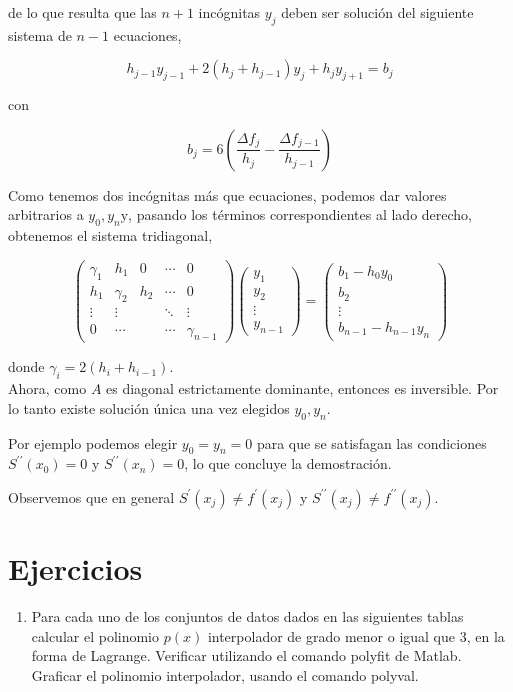 \documentclass[10pt]{book}
\begin{document}
de lo que resulta que las $n+1$ incógnitas $y_{j}$ deben ser solución del siguiente sistema de $n-1$ ecuaciones,

$$
h_{j-1} y_{j-1}+2\left(h_{j}+h_{j-1}\right) y_{j}+h_{j} y_{j+1}=b_{j}
$$

con

$$
b_{j}=6\left(\frac{\Delta f_{j}}{h_{j}}-\frac{\Delta f_{j-1}}{h_{j-1}}\right)
$$

Como tenemos dos incógnitas más que ecuaciones, podemos dar valores arbitrarios a $y_{0}, y_{n} \mathrm{y}$, pasando los términos correspondientes al lado derecho, obtenemos el sistema tridiagonal,

$$
\left(\begin{array}{ccccc}
\gamma_{1} & h_{1} & 0 & \cdots & 0 \\
h_{1} & \gamma_{2} & h_{2} & \cdots & 0 \\
\vdots & \vdots & & \ddots & \vdots \\
0 & \cdots & & \cdots & \gamma_{n-1}
\end{array}\right)\left(\begin{array}{c}
y_{1} \\
y_{2} \\
\vdots \\
y_{n-1}
\end{array}\right)=\left(\begin{array}{c}
b_{1}-h_{0} y_{0} \\
b_{2} \\
\vdots \\
b_{n-1}-h_{n-1} y_{n}
\end{array}\right)
$$

donde $\gamma_{i}=2\left(h_{i}+h_{i-1}\right)$.\\
Ahora, como $A$ es diagonal estrictamente dominante, entonces es inversible. Por lo tanto existe solución única una vez elegidos $y_{0}, y_{n}$.

Por ejemplo podemos elegir $y_{0}=y_{n}=0$ para que se satisfagan las condiciones $S^{\prime \prime}\left(x_{0}\right)=0$ y $S^{\prime \prime}\left(x_{n}\right)=0$, lo que concluye la demostración.

Observemos que en general $S^{\prime}\left(x_{j}\right) \neq f^{\prime}\left(x_{j}\right)$ y $S^{\prime \prime}\left(x_{j}\right) \neq f^{\prime \prime}\left(x_{j}\right)$.

\section{Ejercicios}
\begin{enumerate}
  \item Para cada uno de los conjuntos de datos dados en las siguientes tablas calcular el polinomio $p(x)$ interpolador de grado menor o igual que 3, en la forma de Lagrange. Verificar utilizando el comando polyfit de Matlab. Graficar el polinomio interpolador, usando el comando polyval.
\end{enumerate}
\end{document}
